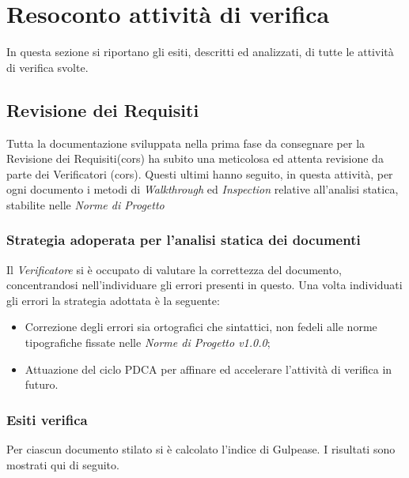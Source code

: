 \chapter{Resoconto attività di verifica } \label{ResocontoAttivitàDiVerifica}
In questa sezione si riportano gli esiti, descritti ed analizzati, di tutte le attività di verifica svolte.
\section{Revisione dei Requisiti} \label{5.1}
Tutta la documentazione sviluppata nella prima fase da consegnare per la Revisione dei Requisiti(cors) ha subito una meticolosa ed attenta revisione da parte dei Verificatori (cors). Questi ultimi hanno seguito, in questa attività, per ogni documento i metodi di \textit{Walkthrough} ed \textit{Inspection} relative all’analisi statica, stabilite nelle \textit{Norme di Progetto} %
\subsection{Strategia adoperata per l’analisi statica dei documenti} \label{5.1.1}
Il \textit{Verificatore} si è occupato di valutare la correttezza del documento, concentrandosi nell’individuare gli errori presenti in questo. Una volta individuati gli errori la strategia adottata è la seguente: 
\begin{itemize}
	\item Correzione degli errori sia ortografici che sintattici, non fedeli alle norme tipografiche fissate nelle \textit{Norme di Progetto v1.0.0};
	\item Attuazione del ciclo PDCA per affinare ed accelerare l’attività di verifica in futuro.
\end{itemize}

\subsection{Esiti verifica} \label{5.1.2}
Per ciascun documento stilato si è calcolato l’indice di Gulpease. I risultati sono mostrati qui di seguito. 



